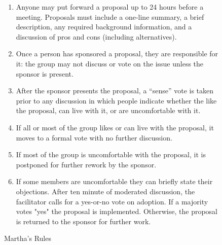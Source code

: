 \documentclass[10pt,letterpaper]{article}
\begin{document}
\begin{figure}[h]
\begin{tcolorbox}
\begin{enumerate}

\item
  Anyone may put forward a proposal up to 24 hours before a meeting.
  Proposals must include a one-line summary,
  a brief description,
  any required background information,
  and a discussion of pros and cons (including alternatives).

\item
  Once a person has sponsored a proposal, they are responsible for it:
  the group may not discuss or vote on the issue unless the sponsor is present.

\item
  After the sponsor presents the proposal,
  a ``sense'' vote is taken prior to any discussion
  in which people indicate whether the like the proposal,
  can live with it,
  or are uncomfortable with it.

\item
  If all or most of the group likes or can live with the proposal,
  it moves to a formal vote with no further discussion.

\item
  If most of the group is uncomfortable with the proposal,
  it is postponed for further rework by the sponsor.

\item
  If some members are uncomfortable they can briefly state their objections.
  After ten minute of moderated discussion,
  the facilitator calls for a yes-or-no vote on adoption.
  If a majority votes "yes" the proposal is implemented.
  Otherwise, the proposal is returned to the sponsor for further work.

\end{enumerate}
\caption{Martha's Rules}
\label{marthas-rules}
\end{tcolorbox}
\end{figure}


\end{document}
